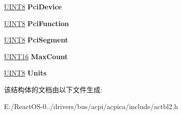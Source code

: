 \begin{DoxyCompactItemize}
\hyperlink{_processor_bind_8h_ab27e9918b538ce9d8ca692479b375b6a}{U\+I\+N\+T8} {\bfseries Pci\+Device}
\item 
\mbox{\label{structacpi__table__wdrt_a08ed578055add7fd8b717d75c9d21767}} 
\hyperlink{_processor_bind_8h_ab27e9918b538ce9d8ca692479b375b6a}{U\+I\+N\+T8} {\bfseries Pci\+Function}
\item 
\mbox{\label{structacpi__table__wdrt_a7041d3cba8eacf64e3623b0484a0b30f}} 
\hyperlink{_processor_bind_8h_ab27e9918b538ce9d8ca692479b375b6a}{U\+I\+N\+T8} {\bfseries Pci\+Segment}
\item 
\mbox{\label{structacpi__table__wdrt_a7229cf9ea4181cc42cf9f5c7112f5e28}} 
\hyperlink{_processor_bind_8h_a09f1a1fb2293e33483cc8d44aefb1eb1}{U\+I\+N\+T16} {\bfseries Max\+Count}
\item 
\mbox{\label{structacpi__table__wdrt_a1022eea000982a1119d065dfde7afb52}} 
\hyperlink{_processor_bind_8h_ab27e9918b538ce9d8ca692479b375b6a}{U\+I\+N\+T8} {\bfseries Units}
\end{DoxyCompactItemize}


该结构体的文档由以下文件生成\+:\begin{DoxyCompactItemize}
\item 
E\+:/\+React\+O\+S-\/0../drivers/bus/acpi/acpica/include/actbl2.\+h\end{DoxyCompactItemize}

